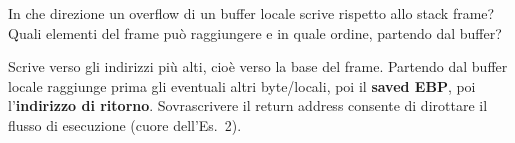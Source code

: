 \question[5]
In che direzione un overflow di un buffer locale scrive rispetto allo stack frame? Quali elementi del frame può raggiungere e in quale ordine, partendo dal buffer?
\begin{solution}
Scrive verso gli indirizzi più alti, cioè verso la base del frame. Partendo dal buffer locale raggiunge prima gli eventuali altri byte/locali, poi il \textbf{saved EBP}, poi l'\textbf{indirizzo di ritorno}.
Sovrascrivere il return address consente di dirottare il flusso di esecuzione (cuore dell'Es.\ 2).
\end{solution}
